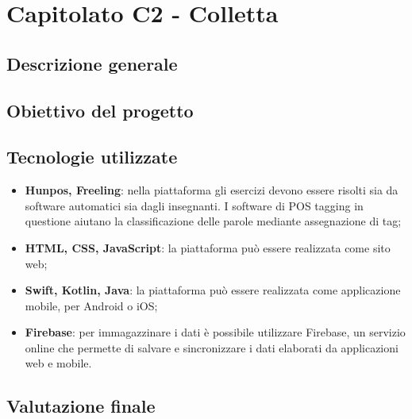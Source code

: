 \section{Capitolato C2 - Colletta}\label{section:c2}

\subsection{Descrizione generale}

\subsection{Obiettivo del progetto}

\subsection{Tecnologie utilizzate}

\begin{itemize}

	\item \textbf{Hunpos, Freeling}: nella piattaforma gli esercizi devono essere risolti sia da software automatici sia dagli insegnanti. I software di POS tagging in questione aiutano la classificazione delle parole mediante assegnazione di tag;

	\item \textbf{HTML, CSS, JavaScript}: la piattaforma può essere realizzata come sito web;
	
	\item \textbf{Swift, Kotlin, Java}: la piattaforma può essere realizzata come applicazione mobile, per Android o iOS;
	
	\item \textbf{Firebase}: per immagazzinare i dati è possibile utilizzare Firebase, un servizio online che permette di salvare e sincronizzare i dati elaborati da applicazioni web e mobile. 
	
\end{itemize}
\subsection{Valutazione finale}

